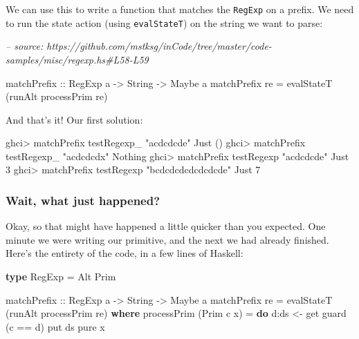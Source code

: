 \documentclass[]{article}
\newenvironment{Shaded}{}{}
\newcommand{\CommentTok}[1]{\textcolor[rgb]{0.38,0.63,0.69}{\textit{#1}}}
\newcommand{\DataTypeTok}[1]{\textcolor[rgb]{0.56,0.13,0.00}{#1}}
\newcommand{\DecValTok}[1]{\textcolor[rgb]{0.25,0.63,0.44}{#1}}
\newcommand{\FunctionTok}[1]{\textcolor[rgb]{0.02,0.16,0.49}{#1}}
\newcommand{\KeywordTok}[1]{\textcolor[rgb]{0.00,0.44,0.13}{\textbf{#1}}}
\newcommand{\NormalTok}[1]{#1}
\newcommand{\OtherTok}[1]{\textcolor[rgb]{0.00,0.44,0.13}{#1}}
\newcommand{\StringTok}[1]{\textcolor[rgb]{0.25,0.44,0.63}{#1}}
\begin{document}
We can use this to write a function that matches the \texttt{RegExp} on a
prefix. We need to run the state action (using \texttt{evalStateT}) on the
string we want to parse:

\begin{Shaded}
\begin{Highlighting}[]
\CommentTok{-- source: https://github.com/mstksg/inCode/tree/master/code-samples/misc/regexp.hs#L58-L59}

\OtherTok{matchPrefix ::} \DataTypeTok{RegExp}\NormalTok{ a }\OtherTok{->} \DataTypeTok{String} \OtherTok{->} \DataTypeTok{Maybe}\NormalTok{ a}
\NormalTok{matchPrefix re }\FunctionTok{=}\NormalTok{ evalStateT (runAlt processPrim re)}
\end{Highlighting}
\end{Shaded}

And that's it! Our first solution:

\begin{Shaded}
\begin{Highlighting}[]
\NormalTok{ghci}\FunctionTok{>}\NormalTok{ matchPrefix testRegexp_ }\StringTok{"acdcdcde"}
\DataTypeTok{Just}\NormalTok{ ()}
\NormalTok{ghci}\FunctionTok{>}\NormalTok{ matchPrefix testRegexp_ }\StringTok{"acdcdcdx"}
\DataTypeTok{Nothing}
\NormalTok{ghci}\FunctionTok{>}\NormalTok{ matchPrefix testRegexp }\StringTok{"acdcdcde"}
\DataTypeTok{Just} \DecValTok{3}
\NormalTok{ghci}\FunctionTok{>}\NormalTok{ matchPrefix testRegexp }\StringTok{"bcdcdcdcdcdcdcde"}
\DataTypeTok{Just} \DecValTok{7}
\end{Highlighting}
\end{Shaded}

\hypertarget{wait-what-just-happened}{%
\subsubsection{Wait, what just happened?}\label{wait-what-just-happened}}

Okay, so that might have happened a little quicker than you expected. One minute
we were writing our primitive, and the next we had already finished. Here's the
entirety of the code, in a few lines of Haskell:

\begin{Shaded}
\begin{Highlighting}[]
\KeywordTok{type} \DataTypeTok{RegExp} \FunctionTok{=} \DataTypeTok{Alt} \DataTypeTok{Prim}

\OtherTok{matchPrefix ::} \DataTypeTok{RegExp}\NormalTok{ a }\OtherTok{->} \DataTypeTok{String} \OtherTok{->} \DataTypeTok{Maybe}\NormalTok{ a}
\NormalTok{matchPrefix re }\FunctionTok{=}\NormalTok{ evalStateT (runAlt processPrim re)}
  \KeywordTok{where}
\NormalTok{    processPrim (}\DataTypeTok{Prim}\NormalTok{ c x) }\FunctionTok{=} \KeywordTok{do}
\NormalTok{      d}\FunctionTok{:}\NormalTok{ds }\OtherTok{<-}\NormalTok{ get}
\NormalTok{      guard (c }\FunctionTok{==}\NormalTok{ d)}
\NormalTok{      put ds}
      \FunctionTok{pure}\NormalTok{ x}
\end{Highlighting}
\end{Shaded}
\end{document}
